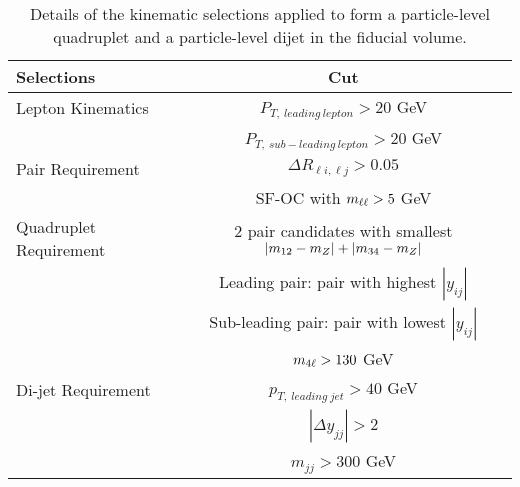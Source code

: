\begin{table}[htbp]
    \caption{Details of the kinematic selections applied to form a particle-level quadruplet and a particle-level dijet in the fiducial volume. 
    \label{tab:QuadDijetFidCut}}
    \begin{tabular}{|| l || c ||}
        \hline
        Selections              &           Cut \\
        \hline\hline
        Lepton Kinematics       & $P_{T,~leading~lepton} > 20 $ GeV\\
                                & $P_{T,~sub-leading~lepton} > 20 $ GeV\\
        \hline 
        Pair Requirement        & $\Delta R_{\ell i,\ell     j} > 0.05 $\\
                                & SF-OC with $m_{\ell\ell} > 5$ GeV\\
        \hline
        Quadruplet Requirement  & $2$ pair candidates with smallest $|m_{12}  - m_{Z} | + |m_{34}    - m_{Z} |$  \\
                                & Leading pair: pair with highest $|y_{ij}|$\\
                                & Sub-leading pair: pair with lowest $|y_{ij}|$\\
                                & $m_{4\ell} > 130 $ GeV\\
        \hline
        Di-jet Requirement      & $p_{T,~leading~jet} > 40$ GeV \\
                                & $|\Delta y_{jj}| > 2 $ \\ 
                                & $m_{jj} > 300$ GeV    \\
        \hline
    \end{tabular}
\end{table}
